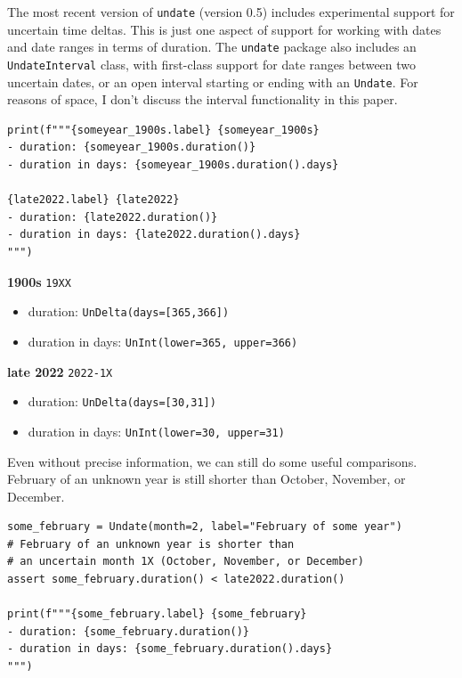 \documentclass[final]{anthology-ch} %
\begin{document}
The most recent version of \texttt{undate} (version 0.5) includes experimental support for uncertain time deltas.  This is just one aspect of support for working with dates and date ranges in terms of duration.  The \texttt{undate} package also includes an \texttt{UndateInterval} class, with first-class support for date ranges between two uncertain dates, or an open interval starting or ending with an \texttt{Undate}. For reasons of space, I don't discuss the interval functionality in this paper.

\begin{verbatim}
print(f"""{someyear_1900s.label} {someyear_1900s}
- duration: {someyear_1900s.duration()}
- duration in days: {someyear_1900s.duration().days}

{late2022.label} {late2022}
- duration: {late2022.duration()}
- duration in days: {late2022.duration().days}
""")
\end{verbatim}



\noindent
\textbf{1900s} \texttt{19XX}
\begin{itemize}
    \item duration: \texttt{UnDelta(days=[365,366])}
    \item duration in days: \texttt{UnInt(lower=365, upper=366)}
\end{itemize}



\noindent
\textbf{late 2022} \texttt{2022-1X}
\begin{itemize}
    \item duration: \texttt{UnDelta(days=[30,31])}
    \item duration in days: \texttt{UnInt(lower=30, upper=31)}
\end{itemize}
    
Even without precise information, we can still do some useful comparisons. February of an unknown year is still shorter than October, November, or December.

\begin{verbatim}
some_february = Undate(month=2, label="February of some year")
# February of an unknown year is shorter than 
# an uncertain month 1X (October, November, or December) 
assert some_february.duration() < late2022.duration()

print(f"""{some_february.label} {some_february}
- duration: {some_february.duration()}
- duration in days: {some_february.duration().days}
""")

\end{verbatim}
\end{document}
